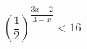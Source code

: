 \begin{ex}
	\begin{condition}
		\( \left( \dfrac{1}{2} \right)^{\dfrac{3x-2}{3-x}}<16 \)
	\end{condition}
\end{ex}